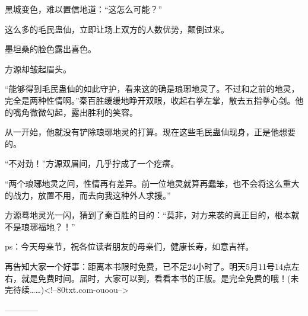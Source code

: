 \begin{this_body}
黑城变色，难以置信地道：“这怎么可能？”

这么多的毛民蛊仙，立即让场上双方的人数优势，颠倒过来。

墨坦桑的脸色露出喜色。

方源却皱起眉头。

“能够得到毛民蛊仙的如此守护，看来这的确是琅琊地灵了。不过和之前的地灵，完全是两种性情啊。”秦百胜缓缓地睁开双眼，收起右拳左掌，散去五指拳心剑。他的嘴角微微勾起，露出胜利的笑容。

从一开始，他就没有铲除琅琊地灵的打算。现在这些毛民蛊仙现身，正是他想要的。

“不对劲！”方源双眉间，几乎拧成了一个疙瘩。

“两个琅琊地灵之间，性情再有差异。前一位地灵就算再蠢笨，也不会将这么重大的战力，放置不用，而去向我这种外人求援。”

方源蓦地灵光一闪，猜到了秦百胜的目的：“莫非，对方来袭的真正目的，根本就不是琅琊福地？！”

ps：今天母亲节，祝各位读者朋友的母亲们，健康长寿，如意吉祥。

再告知大家一个好事：距离本书限时免费，已不足24小时了。明天5月11号14点左右，就是免费时间。届时，大家可以到，看看本书的正版。是完全免费的哦！(未完待续……)<!--80txt.com-ouoou-->

------------

\end{this_body}

